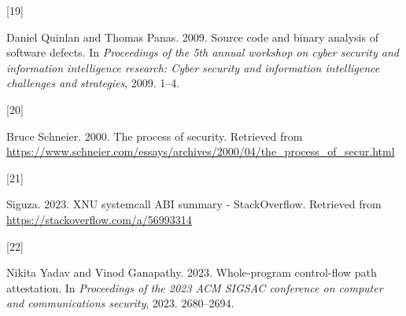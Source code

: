 \documentclass[a4paper, nobind]{templates/ociamthesis}
\newlength{\cslhangindent}
\newlength{\csllabelwidth}
\newenvironment{CSLReferences}[2] %
{\begin{list}{}{%
	\setlength{\itemindent}{0pt}
	\setlength{\leftmargin}{0pt}
	\setlength{\parsep}{0pt}
	\ifodd #1
	\setlength{\leftmargin}{\cslhangindent}
	\setlength{\itemindent}{-1\cslhangindent}
	\fi
	\setlength{\itemsep}{#2\baselineskip}}}
{\end{list}}
\newcommand{\CSLLeftMargin}[1]{\parbox[t]{\csllabelwidth}{\strut#1\strut}}
\newcommand{\CSLRightInline}[1]{\parbox[t]{\linewidth - \csllabelwidth}{\strut#1\strut}}
\begin{document}
\begin{CSLReferences}{0}{0}
\CSLLeftMargin{{[}19{]} }%
\CSLRightInline{Daniel Quinlan and Thomas Panas. 2009. Source code and binary analysis of software defects. In \emph{Proceedings of the 5th annual workshop on cyber security and information intelligence research: Cyber security and information intelligence challenges and strategies}, 2009. 1--4.}

\CSLLeftMargin{{[}20{]} }%
\CSLRightInline{Bruce Schneier. 2000. The process of security. Retrieved from \url{https://www.schneier.com/essays/archives/2000/04/the_process_of_secur.html}}

\CSLLeftMargin{{[}21{]} }%
\CSLRightInline{Siguza. 2023. XNU systemcall ABI summary - StackOverflow. Retrieved from \url{https://stackoverflow.com/a/56993314}}

\CSLLeftMargin{{[}22{]} }%
\CSLRightInline{Nikita Yadav and Vinod Ganapathy. 2023. Whole-program control-flow path attestation. In \emph{Proceedings of the 2023 ACM SIGSAC conference on computer and communications security}, 2023. 2680--2694.}

\end{CSLReferences}

\end{document}
